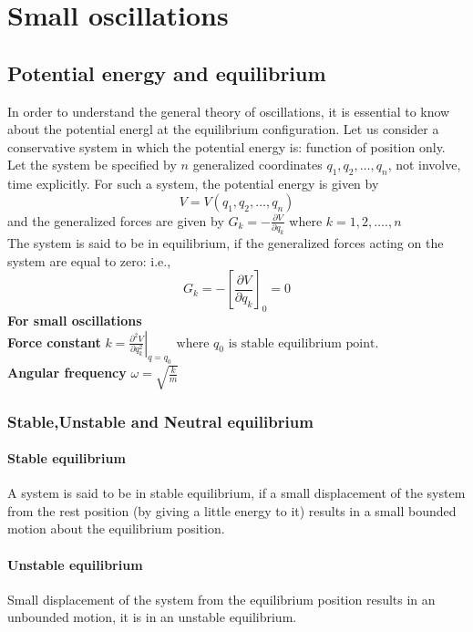 \chapter{Small oscillations}
\section{Potential energy and equilibrium}
In order to understand the general theory of oscillations, it is essential to know about the potential energl at the equilibrium configuration. Let us consider a conservative system in which the potential energy is: function of position only. Let the system be specified by $n$ generalized coordinates $q_{1}, q_{2}, \ldots, q_{n}$, not involve, time explicitly. For such a system, the potential energy is given by
$$
V=V\left(q_{1}, q_{2}, \ldots, q_{n}\right)
$$
and the generalized forces are given by
$G_{k}=-\frac{\partial V}{\partial q_{k}}$ where $k=1,2, \ldots ., n$\\
The system is said to be in equilibrium, if the generalized forces acting on the system are equal to zero: i.e.,
$$
G_{k}=-\left[\frac{\partial V}{\partial q_{k}}\right]_{0}=0
$$
\textbf{For small oscillations}\\
\textbf{Force constant} $k=\left.\frac{\partial^{2} V}{\partial q_k^{2}}\right|_{q=q_{0}} \text { where } q_{0} \text { is stable equilibrium point. }$\\
\textbf{Angular frequency} $\omega=\sqrt{\frac{k}{m}}$
\subsection{Stable,Unstable and Neutral equilibrium}
\subsubsection{Stable equilibrium}
A system is said to be in stable equilibrium, if a small displacement of the system from the rest position (by giving a little energy to it) results in a small bounded motion about the equilibrium position.
\subsubsection{Unstable equilibrium}
Small displacement of the system from the equilibrium position results in an unbounded motion, it is in an unstable equilibrium.
